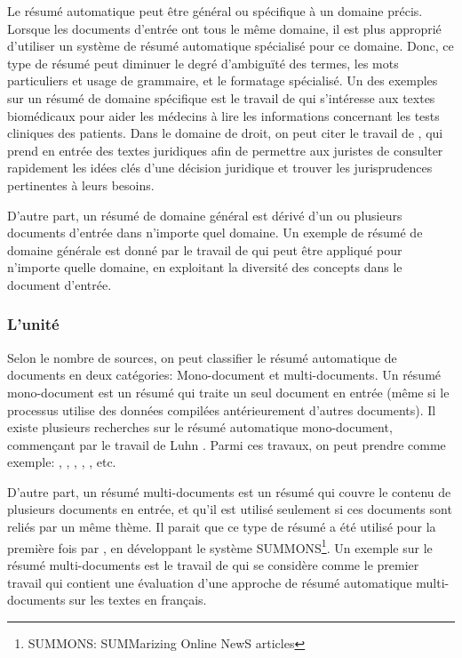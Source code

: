 \documentclass[a4paper,12pt,oneside]{../use/ESIthesis}
\begin{document}
Le résumé automatique peut être général ou spécifique à un domaine précis. 
Lorsque les documents d'entrée ont tous le même domaine, il est plus approprié d'utiliser un système de résumé automatique spécialisé pour ce domaine. 
Donc, ce type de résumé peut diminuer le degré d'ambiguïté des termes, les mots particuliers et usage de grammaire, et le formatage spécialisé.
Un des exemples sur un résumé de domaine spécifique est le travail de \cite{07-reeve-al} qui s'intéresse aux textes biomédicaux pour aider les médecins à lire les informations concernant les tests cliniques des patients. 
Dans le domaine de droit, on peut citer le travail de \cite{04-farzindar-al}, qui prend en entrée des textes juridiques afin de permettre aux juristes de consulter rapidement les idées clés d'une décision juridique et trouver les jurisprudences pertinentes à leurs besoins.

D'autre part, un résumé de domaine général est dérivé d'un ou plusieurs documents d'entrée dans n'importe quel domaine. 
Un exemple de résumé de domaine générale est donné par le travail de \cite{03-nomoto-matsumoto} qui peut être appliqué pour n'importe quelle domaine, en exploitant la diversité des concepts dans le document d'entrée.

\subsubsection{L'unité}

Selon le nombre de sources, on peut classifier le résumé automatique de documents en deux catégories: Mono-document et multi-documents. 
Un résumé mono-document est un résumé qui traite un seul document en entrée (même si le processus utilise des données compilées antérieurement d'autres documents). 
Il existe plusieurs recherches sur le résumé automatique mono-document, commençant par le travail de Luhn \cite{58-luhn}. 
Parmi ces travaux, on peut prendre comme exemple: \cite{69-edmundson}, \cite{93-mitkov}, \cite{95-kupiec-al}, \cite{98-hovy-lin}, \cite{04-farzindar-al}, etc.

D'autre part, un résumé multi-documents est un résumé qui couvre le contenu de plusieurs documents en entrée, et qu'il est utilisé seulement si ces documents sont reliés par un même thème. 
Il parait que ce type de résumé a été utilisé pour la première fois par \cite{95-mckeown-radev}, en développant le système SUMMONS\footnote{SUMMONS: SUMMarizing Online NewS articles}. %
Un exemple sur le résumé multi-documents est le travail de \cite{09-boudin-torresmoreno} qui se considère comme le premier travail qui contient une évaluation d'une approche de résumé automatique multi-documents sur les textes en français. 
\end{document}
